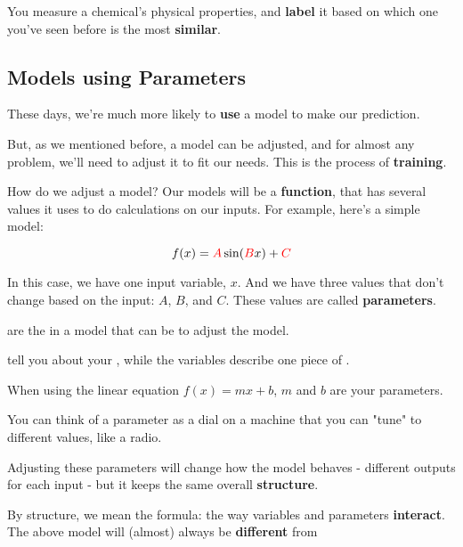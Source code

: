         \miniex You measure a chemical's physical properties, and \textbf{label} it based on which one you've seen before is the most \textbf{similar}.
        
    \subsection{Models using Parameters}
    
        These days, we're much more likely to \textbf{use} a model to make our prediction.
        
        But, as we mentioned before, a model can be adjusted, and for almost any problem, we'll need to adjust it to fit our needs. This is the process of \textbf{training}.
        
        How do we adjust a model? Our models will be a \textbf{function}, that has several values it uses to do calculations on our inputs. For example, here's a simple model:
        
        \begin{equation}
            f(x) = \textcolor{red}{A}\sin(\textcolor{red}{B}x) + \textcolor{red}{C}
        \end{equation}
        
        In this case, we have one input variable, $x$. And we have three values that don't change based on the input: $A$, $B$, and $C$. These values are called \textbf{parameters}.\\
        
        \begin{definition}
             are the   in a model that can be  to adjust the model.

            \subsecdiv

             tell you about your , while the  variables describe one piece of .
        \end{definition}
        
        \miniex When using the linear equation $f(x) = mx+b$, $m$ and $b$ are your parameters.
    
        You can think of a parameter as a dial on a machine that you can "tune" to different values, like a radio.
        
        Adjusting these parameters will change how the model behaves - different outputs for each input - but it keeps the same overall \textbf{structure}.
        
        By structure, we mean the formula: the way variables and parameters \textbf{interact}. The above model will (almost) always be \textbf{different} from 
        \\
        
